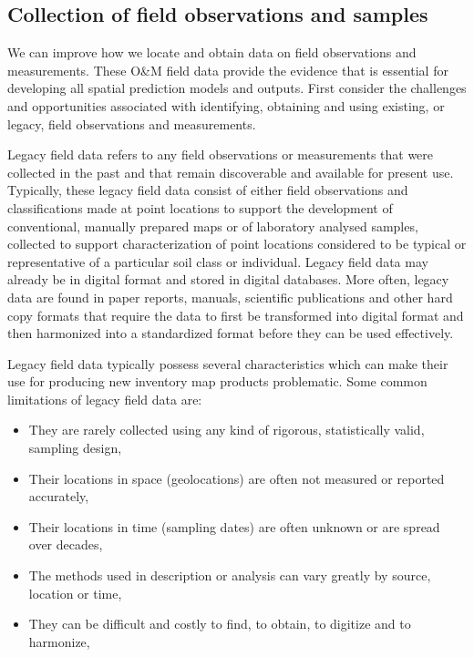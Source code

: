 \documentclass[graybox,natbib,nospthms,UStrade]{svmono}
\begin{document}
\hypertarget{collection-of-field-observations-and-samples}{%
\subsection{Collection of field observations and samples}\label{collection-of-field-observations-and-samples}}

We can improve how we locate and obtain data on field observations and
measurements. These O\&M field data provide the evidence that is
essential for developing all spatial prediction models and outputs.
First consider the challenges and opportunities associated with
identifying, obtaining and using existing, or legacy, field observations
and measurements.

Legacy field data refers to any field observations or measurements that
were collected in the past and that remain discoverable and available
for present use. Typically, these legacy field data consist of either
field observations and classifications made at point locations to
support the development of conventional, manually prepared maps or of
laboratory analysed samples, collected to support characterization of
point locations considered to be typical or representative of a
particular soil class or individual. Legacy field data may already be in
digital format and stored in digital databases. More often, legacy data
are found in paper reports, manuals, scientific publications and other
hard copy formats that require the data to first be transformed into
digital format and then harmonized into a standardized format before
they can be used effectively.

Legacy field data typically possess several characteristics which can
make their use for producing new inventory map products problematic.
Some common limitations of legacy field data are:

\begin{itemize}
\item
  They are rarely collected using any kind of rigorous, statistically
  valid, sampling design,
\item
  Their locations in space (geolocations) are often not measured or
  reported accurately,
\item
  Their locations in time (sampling dates) are often unknown or are
  spread over decades,
\item
  The methods used in description or analysis can vary greatly by
  source, location or time,
\item
  They can be difficult and costly to find, to obtain, to digitize and
  to harmonize,
\end{itemize}
\end{document}
